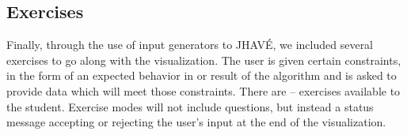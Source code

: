 \documentclass{acm_proc_article-sp}
\begin{document}
\subsection{Exercises}%
Finally, through the use of input generators to JHAVÉ, we included several exercises to go along with the visualization.
The user is given certain constraints, in the form of an expected behavior in or result of the algorithm and is asked to provide data which will meet those constraints.
There are -- exercises available to the student.
Exercise modes will not include questions, but instead a status message accepting or rejecting the user's input at the end of the visualization.

\printbibliography

\balancecolumns
\end{document}
